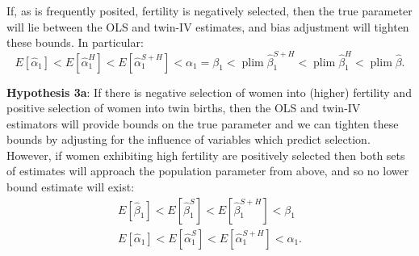\documentclass[subeqn]{article}
\DeclareMathOperator{\plim}{plim}
\begin{document}
\begin{spacing}{1.4}
If, as is frequently posited, fertility is negatively selected, then the true parameter will lie between the OLS and twin-IV estimates, and bias adjustment will tighten these bounds. In particular:
\[
E[\hat\alpha_1] < E[\hat\alpha_1^{H}] < E[\hat\alpha_1^{S+H}] < \alpha_1 =  \beta_1 < \plim\hat\beta_1^{S+H} < \plim\hat\beta_1^{H}<\plim\hat\beta.
\]

\noindent \textbf{Hypothesis 3a}: If there is negative selection of women into (higher) fertility and positive selection of women into twin births, then the OLS and twin-IV estimators will provide bounds on the true parameter and we can tighten these bounds by adjusting for the influence of variables which predict selection.
\\
However, if women exhibiting high fertility are positively selected then both sets of estimates will approach the population parameter from above, and so
no lower bound estimate will exist:
\begin{eqnarray}
  E[\hat\beta_1] < E[\hat\beta_1^{S}] < E[\hat\beta_1^{S+H}] < \beta_1  \nonumber \\
  E[\hat\alpha_1] < E[\hat\alpha_1^{S}] < E[\hat\alpha_1^{S+H}] < \alpha_1. \nonumber
\end{eqnarray}



\end{spacing}
\end{document}
